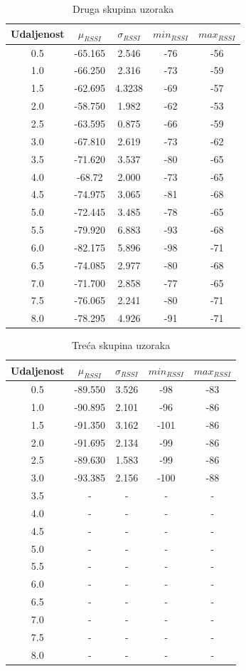 \begin{table}[H]
	\centering
	\caption{Druga skupina uzoraka}
	\label{tbl:indoorKontaktMaxTx}
	\small
	\begin{tabular}{ccccc}
	\hline 
	Udaljenost & $\mu_{RSSI}$ & $\sigma_{RSSI}$ & $min_{RSSI}$ & $max_{RSSI}$ \\ 
	\hline 
	0.5 & -65.165 & 2.546 & -76 & -56 \\
	1.0 & -66.250 & 2.316 & -73 & -59 \\
	1.5 & -62.695 & 4.3238 & -69 & -57 \\
	2.0 & -58.750 & 1.982 & -62 & -53 \\
	2.5 & -63.595 & 0.875 & -66 & -59 \\
	3.0 & -67.810 & 2.619 & -73 & -62 \\
	3.5 & -71.620 & 3.537 & -80 & -65 \\
	4.0 & -68.72 & 2.000 & -73 & -65 \\
	4.5 & -74.975 & 3.065 & -81 & -68 \\
	5.0 & -72.445 & 3.485 & -78 & -65 \\
	5.5 & -79.920 & 6.883 & -93 & -68 \\
	6.0 & -82.175 & 5.896 & -98 & -71 \\
	6.5 & -74.085 & 2.977 & -80 & -68 \\
	7.0 & -71.700 & 2.858 & -77 & -65 \\
	7.5 & -76.065 & 2.241 & -80 & -71 \\
	8.0 & -78.295 & 4.926 & -91 & -71 \\
	\hline
	\end{tabular}
\end{table}

\begin{table}[H]
	\centering
	\caption{Treća skupina uzoraka}
	\label{tbl:blucatsDefault}
	\small
	\begin{tabular}{ccccc}
	\hline
	Udaljenost & $\mu_{RSSI}$ & $\sigma_{RSSI}$ & $min_{RSSI}$ & $max_{RSSI}$ \\
	\hline
	0.5 & -89.550 & 3.526 & -98 & -83 \\
	1.0 & -90.895 & 2.101 & -96 & -86 \\
	1.5 & -91.350 & 3.162 & -101 & -86 \\
	2.0 & -91.695 & 2.134 & -99 & -86 \\
	2.5 & -89.630 & 1.583 & -99 & -86 \\
	3.0 & -93.385 & 2.156 & -100 & -88 \\
	3.5 & - & - & - & - \\
	4.0 & - & - & - & - \\
	4.5 & - & - & - & - \\
	5.0 & - & - & - & - \\
	5.5 & - & - & - & - \\
	6.0 & - & - & - & - \\
	6.5 & - & - & - & - \\
	7.0 & - & - & - & - \\
	7.5 & - & - & - & - \\
	8.0 & - & - & - & - \\
	\hline
	\end{tabular}
\end{table}

